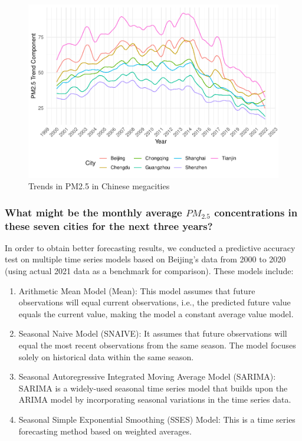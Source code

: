 \documentclass[
  12pt,
]{article}
\providecommand{\tightlist}{%
  \setlength{\itemsep}{0pt}\setlength{\parskip}{0pt}}
\begin{document}
\begin{figure}
\centering
\includegraphics{LiFangRenZhang_ENV872_Project_files/figure-latex/trend figure-1.pdf}
\caption{Trends in PM2.5 in Chinese megacities}
\end{figure}

\hypertarget{what-might-be-the-monthly-average-pm_2.5-concentrations-in-these-seven-cities-for-the-next-three-years}{%
\subsubsection{\texorpdfstring{What might be the monthly average
\(PM_{2.5}\) concentrations in these seven cities for the next three
years?}{What might be the monthly average PM\_\{2.5\} concentrations in these seven cities for the next three years?}}\label{what-might-be-the-monthly-average-pm_2.5-concentrations-in-these-seven-cities-for-the-next-three-years}}

In order to obtain better forecasting results, we conducted a predictive
accuracy test on multiple time series models based on Beijing's data
from 2000 to 2020 (using actual 2021 data as a benchmark for
comparison). These models include:

\begin{enumerate}
\def\labelenumi{\arabic{enumi}.}
\tightlist
\item
  Arithmetic Mean Model (Mean): This model assumes that future
  observations will equal current observations, i.e., the predicted
  future value equals the current value, making the model a constant
  average value model.
\item
  Seasonal Naive Model (SNAIVE): It assumes that future observations
  will equal the most recent observations from the same season. The
  model focuses solely on historical data within the same season.
\item
  Seasonal Autoregressive Integrated Moving Average Model (SARIMA):
  SARIMA is a widely-used seasonal time series model that builds upon
  the ARIMA model by incorporating seasonal variations in the time
  series data.
\item
  Seasonal Simple Exponential Smoothing (SSES) Model: This is a time
  series forecasting method based on weighted averages.
\end{enumerate}
\end{document}
